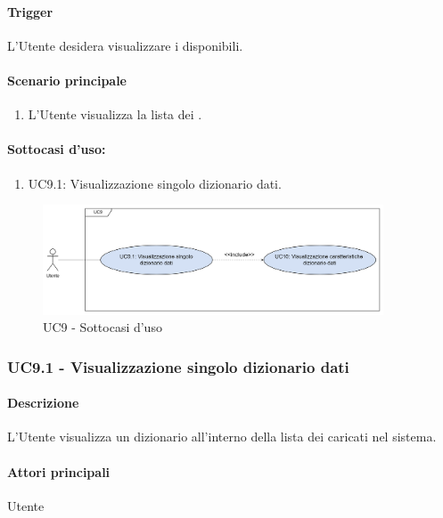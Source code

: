 \paragraph*{Trigger}
L'Utente desidera visualizzare i  disponibili.

\paragraph*{Scenario principale}
\begin{enumerate}
  \item L'Utente visualizza la lista dei .
\end{enumerate}

\paragraph*{Sottocasi d'uso:}
\begin{enumerate}
  \item UC9.1: Visualizzazione singolo dizionario dati.
\end{enumerate}

\begin{figure}[H]
  \centering
  \includegraphics[width=0.90\textwidth]{assets/uc9_1.png}
  \caption{UC9 - Sottocasi d'uso}
\end{figure}


\subsubsection{UC9.1 - Visualizzazione singolo dizionario dati}\label{UC9point1}
\paragraph*{Descrizione}
L'Utente visualizza un dizionario all'interno della lista dei  caricati nel sistema.

\paragraph*{Attori principali}
Utente

